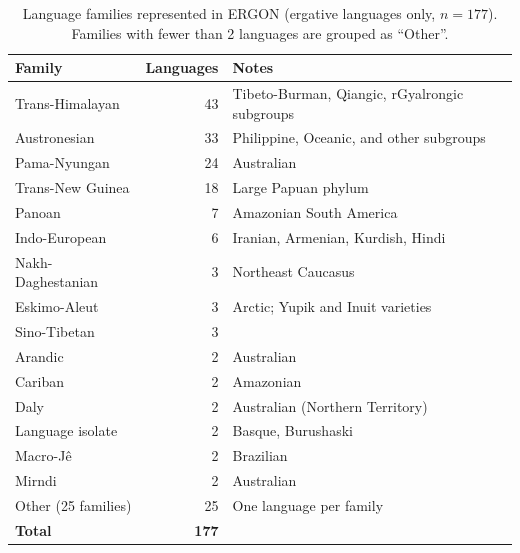 \documentclass[12pt,a4paper]{article}
\begin{document}
\begin{table}[H]
\centering
\caption{Language families represented in ERGON (ergative languages only, $n = 177$). Families with fewer than 2 languages are grouped as ``Other''.}
\label{tab:families}
\begin{tabular}{lrl}
\toprule
\textbf{Family} & \textbf{Languages} & \textbf{Notes} \\
\midrule
Trans-Himalayan      & 43 & Tibeto-Burman, Qiangic, rGyalrongic subgroups \\
Austronesian         & 33 & Philippine, Oceanic, and other subgroups \\
Pama-Nyungan         & 24 & Australian \\
Trans-New Guinea     & 18 & Large Papuan phylum \\
Panoan               &  7 & Amazonian South America \\
Indo-European        &  6 & Iranian, Armenian, Kurdish, Hindi \\
Nakh-Daghestanian    &  3 & Northeast Caucasus \\
Eskimo-Aleut         &  3 & Arctic; Yupik and Inuit varieties \\
Sino-Tibetan         &  3 & \\
Arandic              &  2 & Australian \\
Cariban              &  2 & Amazonian \\
Daly                 &  2 & Australian (Northern Territory) \\
Language isolate     &  2 & Basque, Burushaski \\
Macro-J\^{e}         &  2 & Brazilian \\
Mirndi               &  2 & Australian \\
Other (25 families)  & 25 & One language per family \\
\midrule
\textbf{Total}       & \textbf{177} & \\
\bottomrule
\end{tabular}
\end{table}

\bigskip
\end{document}
